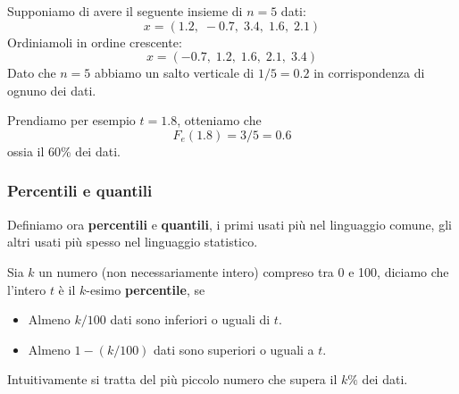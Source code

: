 \begin{example}
	Supponiamo di avere il seguente insieme di $n = 5$ dati:
	\[ x = (1.2, \; -0.7, \; 3.4, \; 1.6, \; 2.1) \]
	Ordiniamoli in ordine crescente:
	\[ x = (-0.7, \; 1.2, \; 1.6, \; 2.1, \; 3.4) \]
	Dato che $n = 5$ abbiamo un salto verticale di $1/5 = 0.2$ in corrispondenza di ognuno dei dati.
	\begin{center}
	\end{center}
	Prendiamo per esempio $t = 1.8$, otteniamo che
	\[ F_e(1.8) = 3/5 = 0.6 \]
	ossia il 60\% dei dati.
\end{example}

\subsubsection{Percentili e quantili}
Definiamo ora \textbf{percentili} e \textbf{quantili}, i primi usati più nel linguaggio comune, gli altri usati più
spesso nel linguaggio statistico.

\begin{definition}
	Sia $k$ un numero (non necessariamente intero) compreso tra 0 e 100, diciamo che l'intero $t$ è il $k$-esimo
	\textbf{percentile}, se
	\begin{itemize}
		\item Almeno $k / 100$ dati sono inferiori o uguali di $t$.
		\item Almeno $1 - (k / 100)$ dati sono superiori o uguali a $t$.
	\end{itemize}
	Intuitivamente si tratta del più piccolo numero che supera il $k \%$ dei dati.
\end{definition}

